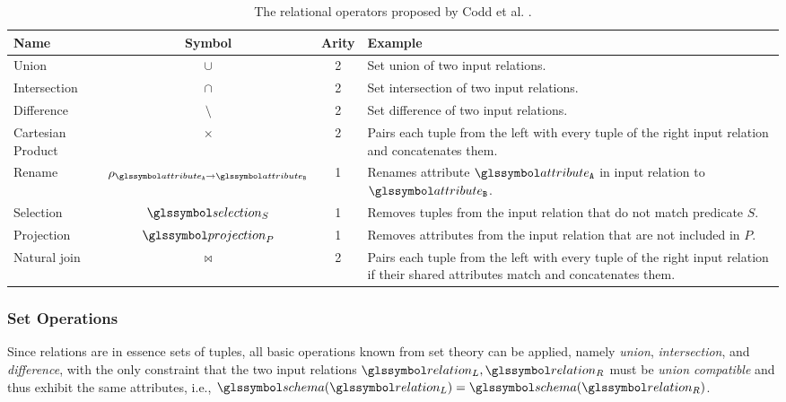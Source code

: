 \begin{table}
    \caption{The relational operators proposed by Codd et al. \cite{Codd:1970Relational,Garcia:2009Database}.}
    \label{table:relational_operators}
    \begin{tabular}{| l | c | c | p{75mm} |}
        \hline
       \textbf{Name} & \textbf{Symbol} & \textbf{Arity}  & \textbf{Example} \\ 
        \hline
        \hline
        Union & $\cup$  & 2 & Set union of two input relations. \\
        \hline
        Intersection & $\cap$  & 2 & Set intersection of two input relations. \\
        \hline
        Difference & $\setminus$  & 2 & Set difference of two input relations. \\
        \hline
        Cartesian Product & $\times$ & 2 & Pairs each tuple from the left with every tuple of the right input relation and concatenates them. \\
        \hline
        Rename & $\rho_{\attribute_\mathtt{A} \rightarrow \attribute_\mathtt{B}}$ &  1 & Renames attribute $\attribute_\mathtt{A}$ in input relation to $\attribute_\mathtt{B}$. \\
        \hline
        Selection & $\selection_{S}$ &  1 & Removes tuples from the input relation that do not match predicate $S$. \\
        \hline
        Projection & $\projection_{P}$ &  1 & Removes attributes from the input relation that are not included in $P$. \\
        \hline
        Natural join & $\Join$ & 2 & Pairs each tuple from the left with every tuple of the right input relation if their shared attributes match and concatenates them. \\
        \hline
    \end{tabular}
\end{table}

\subsubsection{Set Operations}

Since relations are in essence sets of tuples, all basic operations known from set theory can be applied, namely \emph{union}, \emph{intersection}, and \emph{difference}, with the only constraint that the two input relations $\relation_L,\relation_R$ must be \emph{union compatible} and thus exhibit the same attributes, i.e., $\schema(\relation_L) = \schema(\relation_R)$.

